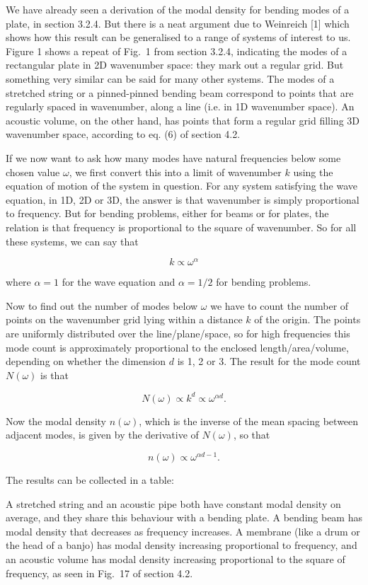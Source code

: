   We have already seen a derivation of the modal density for bending modes of a 
  plate, in section 3.2.4. But there is a neat argument due to Weinreich [1] 
  which shows how this result can be generalised to a range of systems of 
  interest to us. Figure 1 shows a repeat of Fig.\ 1 from section 3.2.4, 
  indicating the modes of a rectangular plate in 2D wavenumber space: they mark 
  out a regular grid. But something very similar can be said for many other 
  systems. The modes of a stretched string or a pinned-pinned bending beam 
  correspond to points that are regularly spaced in wavenumber, along a line 
  (i.e. in 1D wavenumber space). An acoustic volume, on the other hand, has 
  points that form a regular grid filling 3D wavenumber space, according to eq. 
  (6) of section 4.2. 

  If we now want to ask how many modes have natural frequencies below some 
  chosen value $\omega$, we first convert this into a limit of wavenumber $k$ 
  using the equation of motion of the system in question. For any system 
  satisfying the wave equation, in 1D, 2D or 3D, the answer is that wavenumber 
  is simply proportional to frequency. But for bending problems, either for 
  beams or for plates, the relation is that frequency is proportional to the 
  square of wavenumber. So for all these systems, we can say that 

  $$k \propto \omega^\alpha \tag{1}$$ 

  where $\alpha=1$ for the wave equation and $\alpha = 1/2$ for bending 
  problems. 

  Now to find out the number of modes below $\omega$ we have to count the 
  number of points on the wavenumber grid lying within a distance $k$ of the 
  origin. The points are uniformly distributed over the line/plane/space, so 
  for high frequencies this mode count is approximately proportional to the 
  enclosed length/area/volume, depending on whether the dimension $d$ is 1, 2 
  or 3. The result for the mode count $N(\omega)$ is that 

  $$N(\omega) \propto k^d \propto \omega^{\alpha d} . \tag{2}$$ 

  Now the modal density $n(\omega)$, which is the inverse of the mean spacing 
  between adjacent modes, is given by the derivative of $N(\omega)$, so that 

  $$n(\omega) \propto \omega^{\alpha d -1} . \tag{3}$$ 

  The results can be collected in a table: 

  A stretched string and an acoustic pipe both have constant modal density on 
  average, and they share this behaviour with a bending plate. A bending beam 
  has modal density that decreases as frequency increases. A membrane (like a 
  drum or the head of a banjo) has modal density increasing proportional to 
  frequency, and an acoustic volume has modal density increasing proportional 
  to the square of frequency, as seen in Fig.\ 17 of section 4.2. 

